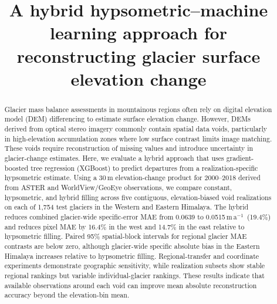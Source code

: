 \documentclass[tc,manuscript]{copernicus}
\newcommand{\rate}{\ensuremath{\mathrm{m\,a^{-1}}}}
\begin{document}
\title{A hybrid hypsometric--machine learning approach for reconstructing glacier surface elevation change}
\received{}\pubdiscuss{}\revised{}\accepted{}\published{}
\maketitle

\begin{abstract}
Glacier mass balance assessments in mountainous regions often rely on digital elevation model (DEM) differencing to estimate surface elevation change. However, DEMs derived from optical stereo imagery commonly contain spatial data voids, particularly in high-elevation accumulation zones where low surface contrast limits image matching. These voids require reconstruction of missing values and introduce uncertainty in glacier-change estimates. Here, we evaluate a hybrid approach that uses gradient-boosted tree regression (XGBoost) to predict departures from a realization-specific hypsometric estimate. Using a 30\,m elevation-change product for 2000--2018 derived from ASTER and WorldView/GeoEye observations, we compare constant, hypsometric, and hybrid filling across five contiguous, elevation-biased void realizations on each of 1,754 test glaciers in the Western and Eastern Himalaya. The hybrid reduces combined glacier-wide specific-error MAE from 0.0639 to 0.0515\,\rate\ (19.4\%) and reduces pixel MAE by 16.4\% in the west and 14.7\% in the east relative to hypsometric filling. Paired 95\% spatial-block intervals for regional glacier MAE contrasts are below zero, although glacier-wide specific absolute bias in the Eastern Himalaya increases relative to hypsometric filling. Regional-transfer and coordinate experiments demonstrate geographic sensitivity, while realization subsets show stable regional rankings but variable individual-glacier rankings. These results indicate that available observations around each void can improve mean absolute reconstruction accuracy beyond the elevation-bin mean.
\end{abstract}

\introduction[Introduction]  %
\end{document}
